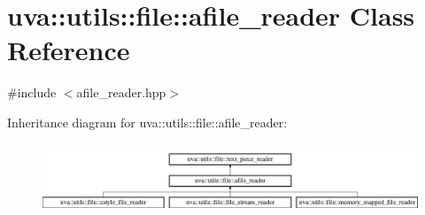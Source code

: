 \hypertarget{classuva_1_1utils_1_1file_1_1afile__reader}{}\section{uva\+:\+:utils\+:\+:file\+:\+:afile\+\_\+reader Class Reference}
\label{classuva_1_1utils_1_1file_1_1afile__reader}


{\ttfamily \#include $<$afile\+\_\+reader.\+hpp$>$}

Inheritance diagram for uva\+:\+:utils\+:\+:file\+:\+:afile\+\_\+reader\+:\begin{figure}[H]
\begin{center}
\leavevmode
\includegraphics[height=2.137405cm]{classuva_1_1utils_1_1file_1_1afile__reader}
\end{center}
\end{figure}
